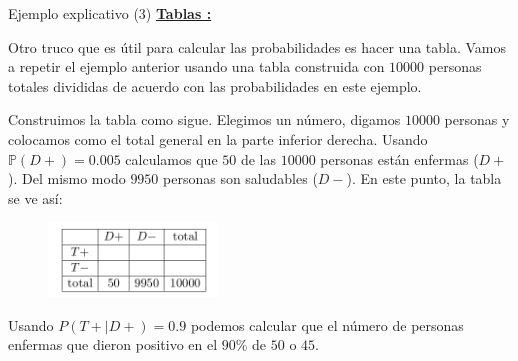 \documentclass[10pt]{beamer}
\begin{document}
\begin{frame}{Ejemplo explicativo (3)}
\small\underline{\textbf{Tablas :}}{ Otro truco que es \'util para calcular las probabilidades es hacer una tabla. Vamos a repetir el ejemplo anterior usando una tabla construida con $10000$ personas totales divididas de acuerdo con las probabilidades en este ejemplo.

Construimos la tabla como sigue. Elegimos un n\'umero, digamos $10000$ personas  y colocamos  como el total general en la parte inferior derecha. Usando $\mathbb{P}(D +) = 0.005$ calculamos que $50$ de las $10000$ personas est\'an enfermas ($D+$). Del mismo modo $9950$ personas son saludables ($D-$). En este punto, la tabla se ve as\'i:

\begin{figure}[h]
	\centering
	\includegraphics[width=4.5cm]{g8}
\end{figure}

Usando $P(T+|D +) = 0.9$ podemos calcular que el n\'umero de personas enfermas que dieron positivo en el $90\%$ de $50$ o $45$.
}
\end{frame}
\end{document}
